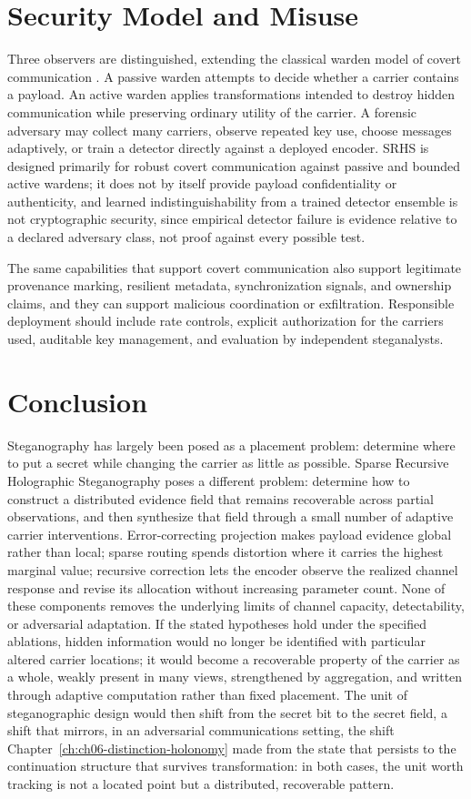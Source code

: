 \section{Security Model and Misuse}

Three observers are distinguished, extending the classical warden model of covert communication \cite{simmons1984}. A passive warden attempts to decide whether a carrier contains a payload. An active warden applies transformations intended to destroy hidden communication while preserving ordinary utility of the carrier. A forensic adversary may collect many carriers, observe repeated key use, choose messages adaptively, or train a detector directly against a deployed encoder. SRHS is designed primarily for robust covert communication against passive and bounded active wardens; it does not by itself provide payload confidentiality or authenticity, and learned indistinguishability from a trained detector ensemble is not cryptographic security, since empirical detector failure is evidence relative to a declared adversary class, not proof against every possible test.

The same capabilities that support covert communication also support legitimate provenance marking, resilient metadata, synchronization signals, and ownership claims, and they can support malicious coordination or exfiltration. Responsible deployment should include rate controls, explicit authorization for the carriers used, auditable key management, and evaluation by independent steganalysts.

\section{Conclusion}

Steganography has largely been posed as a placement problem: determine where to put a secret while changing the carrier as little as possible. Sparse Recursive Holographic Steganography poses a different problem: determine how to construct a distributed evidence field that remains recoverable across partial observations, and then synthesize that field through a small number of adaptive carrier interventions. Error-correcting projection makes payload evidence global rather than local; sparse routing spends distortion where it carries the highest marginal value; recursive correction lets the encoder observe the realized channel response and revise its allocation without increasing parameter count. None of these components removes the underlying limits of channel capacity, detectability, or adversarial adaptation. If the stated hypotheses hold under the specified ablations, hidden information would no longer be identified with particular altered carrier locations; it would become a recoverable property of the carrier as a whole, weakly present in many views, strengthened by aggregation, and written through adaptive computation rather than fixed placement. The unit of steganographic design would then shift from the secret bit to the secret field, a shift that mirrors, in an adversarial communications setting, the shift Chapter~\ref{ch:ch06-distinction-holonomy} made from the state that persists to the continuation structure that survives transformation: in both cases, the unit worth tracking is not a located point but a distributed, recoverable pattern.
